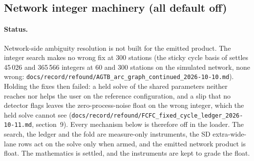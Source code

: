 \documentclass[main.tex]{subfiles}
\begin{document}
\subsection{Network integer machinery (all default off)}\label{sec:ar-network}

\paragraph{Status.}
Network-side ambiguity resolution is not built for the emitted product.  The
integer search makes no wrong fix at 300 stations (the sticky cycle basis of
 settles 45\,026 and 365\,566 integers at 60 and 300
stations on the simulated network, none wrong:
\texttt{docs/record/refound/AGTB\_arc\_graph\_continued\_2026-10-10.md}).  Holding
the fixes then failed: a held solve of the shared parameters neither reaches
nor helps the user on the reference configuration, and a slip that no
detector flags leaves the zero-process-noise float on the wrong integer,
which the held solve cannot see
(\texttt{docs/record/refound/FCFC\_fixed\_cycle\_ledger\_2026-10-11.md}, section~9).
Every mechanism below is therefore off in the loader.  The search, the ledger
and the fold are measure-only instruments, the SD extra-wide-lane rows act on
the solve only when armed, and the emitted network product is float.  The
mathematics is settled, and the instruments are kept to grade the float.
\end{document}
